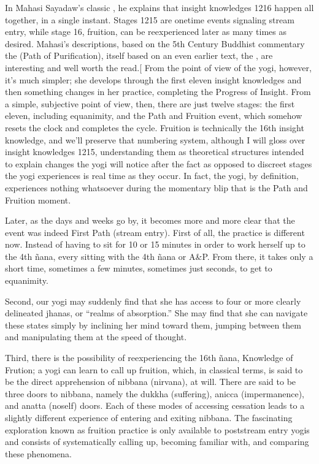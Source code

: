 \documentclass[a5paper,10pt,english]{book}
\begin{document}
\sphinxAtStartPar
In Mahasi Sayadaw’s classic , he explains that
insight knowledges 12\sphinxhyphen{}16 happen all together, in a single instant.
Stages 12\sphinxhyphen{}15 are one\sphinxhyphen{}time events signaling stream entry, while stage 16,
fruition, can be re\sphinxhyphen{}experienced later as many times as desired. Mahasi’s
descriptions, based on the 5th Century Buddhist commentary the
 (Path of Purification), itself based on an even earlier
text, the , are interesting and well worth the
read.{[}\sphinxurl{http://www.accesstoinsight.org/lib/authors/mahasi/progress.html\#ch7.17}{]}
From the point of view of the yogi, however, it’s much simpler; she
develops through the first eleven insight knowledges and then something
changes in her practice, completing the Progress of Insight. From a
simple, subjective point of view, then, there are just twelve stages:
the first eleven, including equanimity, and the Path and Fruition event,
which somehow resets the clock and completes the cycle. Fruition is
technically the 16th insight knowledge, and we’ll preserve that
numbering system, although I will gloss over insight knowledges 12\sphinxhyphen{}15,
understanding them as theoretical structures intended to explain changes
the yogi will notice after the fact as opposed to discreet stages the
yogi experiences is real time as they occur. In fact, the yogi, by
definition, experiences nothing whatsoever during the momentary blip
that is the Path and Fruition moment.

\sphinxAtStartPar
Later, as the days and weeks go by, it becomes more and more clear that
the event was indeed First Path (stream entry). First of all, the
practice is different now. Instead of having to sit for 10 or 15 minutes
in order to work herself up to the 4th ñana, every sitting  with
the 4th ñana or A\&P. From there, it takes only a short time, sometimes a
few minutes, sometimes just seconds, to get to equanimity.

\sphinxAtStartPar
Second, our yogi may suddenly find that she has access to four or more
clearly delineated jhanas, or “realms of absorption.” She may find that
she can navigate these states simply by inclining her mind toward them,
jumping between them and manipulating them at the speed of thought.

\sphinxAtStartPar
Third, there is the possibility of re\sphinxhyphen{}experiencing the 16th ñana,
Knowledge of Frution; a yogi can learn to call up fruition, which, in
classical terms, is said to be the direct apprehension of nibbana
(nirvana), at will. There are said to be three doors to nibbana, namely
the dukkha (suffering), anicca (impermanence), and anatta (no\sphinxhyphen{}self)
doors. Each of these modes of accessing cessation leads to a slightly
different experience of entering and exiting nibbana. The fascinating
exploration known as fruition practice is only available to post\sphinxhyphen{}stream
entry yogis and consists of systematically calling up, becoming familiar
with, and comparing these phenomena.
\end{document}
